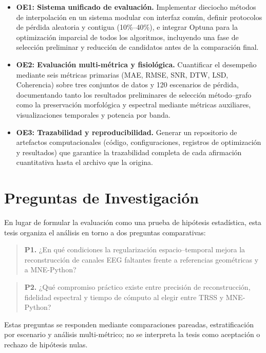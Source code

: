 \begin{itemize}
  \item \textbf{OE1: Sistema unificado de evaluación.} Implementar dieciocho métodos de interpolación en un sistema modular con interfaz común, definir protocolos de pérdida aleatoria y contigua (10\%--40\%), e integrar Optuna para la optimización imparcial de todos los algoritmos, incluyendo una fase de selección preliminar y reducción de candidatos antes de la comparación final.

  \item \textbf{OE2: Evaluación multi-métrica y fisiológica.} Cuantificar el desempeño mediante seis métricas primarias (MAE, RMSE, SNR, DTW, LSD, Coherencia) sobre tres conjuntos de datos y 120 escenarios de pérdida, documentando tanto los resultados preliminares de selección método--grafo como la preservación morfológica y espectral mediante métricas auxiliares, visualizaciones temporales y potencia por banda.

  \item \textbf{OE3: Trazabilidad y reproducibilidad.} Generar un repositorio de artefactos computacionales (código, configuraciones, registros de optimización y resultados) que garantice la trazabilidad completa de cada afirmación cuantitativa hasta el archivo que la origina.
\end{itemize}

\section{Preguntas de Investigación}

En lugar de formular la evaluación como una prueba de hipótesis estadística, esta tesis organiza el análisis en torno a dos preguntas comparativas:

\begin{quote}
\textbf{P1.} ¿En qué condiciones la regularización espacio--temporal mejora la reconstrucción de canales EEG faltantes frente a referencias geométricas y a MNE-Python? %
\end{quote}

\begin{quote}
\textbf{P2.} ¿Qué compromiso práctico existe entre precisión de reconstrucción, fidelidad espectral y tiempo de cómputo al elegir entre TRSS y MNE-Python?
\end{quote}

Estas preguntas se responden mediante comparaciones pareadas, estratificación por escenario y análisis multi-métrico; no se interpreta la tesis como aceptación o rechazo de hipótesis nulas.

